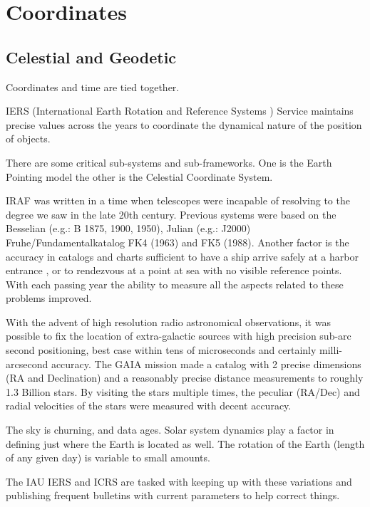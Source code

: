 
\renewcommand{\footerfilename}{Coordinates.tex}

\section{Coordinates}


\subsection{Celestial and Geodetic}


Coordinates and time are tied together. 


IERS (International Earth Rotation and Reference Systems ) Service
maintains precise values across the years to coordinate the dynamical
nature of the position of objects.

There are some critical sub-systems and sub-frameworks. One is the
Earth Pointing model the other is the Celestial Coordinate System.

IRAF was written in a time when telescopes were incapable of resolving
to the degree we saw in the late 20th century. Previous systems were
based on the Besselian (e.g.: B 1875, 1900, 1950), Julian (e.g.:
J2000) Fr\:uhe/Fundamentalkatalog FK4 (1963) and FK5 (1988). Another
factor is the accuracy in catalogs and charts sufficient to have a
ship arrive safely at a harbor entrance , or to rendezvous at a point
at sea with no visible reference points. With each passing year the
ability to measure all the aspects related to these problems improved.

With the advent of high resolution radio astronomical observations, it
was possible to fix the location of extra-galactic sources with
high precision sub-arc second positioning, best case within tens of microseconds
and certainly milli-arcsecond accuracy. The GAIA mission made a catalog
with 2 precise dimensions (RA and Declination) and a reasonably precise
distance measurements to roughly 1.3 Billion stars. By visiting the
stars multiple times, the peculiar (RA/Dec) and radial velocities
of the stars were measured with decent accuracy. 

The sky is churning, and data ages. Solar system dynamics play a factor
in defining just where the Earth is located as well. The rotation
of the Earth (length of any given day) is variable to small amounts.

The IAU IERS and ICRS are tasked with keeping up with these variations
and publishing frequent bulletins with current parameters to help
correct things. 

